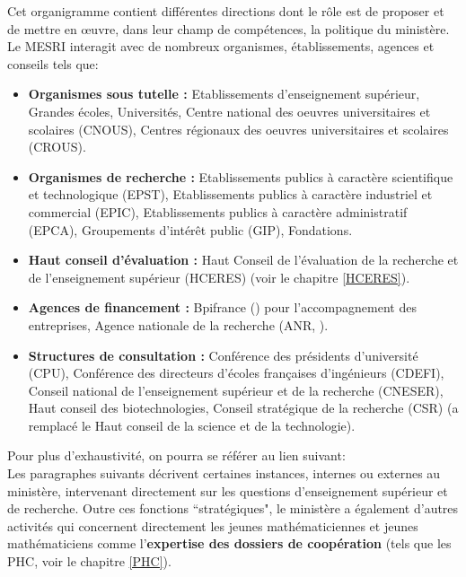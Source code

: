 Cet organigramme contient diff{\'e}rentes directions dont le r\^ole est de proposer et de mettre en \oe{}uvre, dans leur champ de comp\'etences, la politique du minist\`ere.
\newline
\newline
Le MESRI interagit avec de nombreux organismes, \'etablisse\-ments, agences et conseils tels que:
\begin{itemize}
 \item \textbf{Organismes sous tutelle :} Etablissements d'enseignement sup{\'e}rieur, Grandes {\'e}coles, Universit{\'e}s,
 Centre national des oeuvres universitaires et scolaires (CNOUS), Centres r{\'e}gionaux des oeuvres universitaires et scolaires (CROUS).
 
 \item \textbf{Organismes de recherche :} Etablissements publics {\`a} caract{\`e}re scientifique et technologique (EPST),
 Etablissements publics {\`a} caract{\`e}re industriel et commercial (EPIC), Etablissements publics {\`a} caract{\`e}re administratif (EPCA),  Groupements d'int{\'e}r{\^e}t public (GIP), Fondations.
 
 \item \textbf{Haut conseil d'{\'e}valuation :} Haut Conseil de l'{\'e}valuation de la recherche et de l'enseignement sup{\'e}rieur (HCERES) (voir le chapitre \ref{HCERES}).
 
 \item \textbf{Agences de financement :} Bpifrance ({\small{}}) pour l'accompagnement des entreprises, Agence nationale de la recherche (ANR,
 {\small{}}).

 \item \textbf{Structures de consultation :} Conf{\'e}rence des pr{\'e}sidents d'universit{\'e} (CPU), 
 Conf{\'e}rence des directeurs d'{\'e}coles fran\c caises d'ing{\'e}nieurs (CDEFI),
 Conseil national de l'enseignement sup{\'e}rieur et de la recherche (CNESER), Haut conseil des biotechnologies, 
 Conseil strat{\'e}gique de la recherche (CSR) (a remplac{\'e} le Haut conseil de la science et de la technologie).
\end{itemize}
Pour plus d'exhaustivit\'e, on pourra se r\'ef\'erer au lien suivant: \\
{\small {}}
\newline
\newline
Les paragraphes suivants d\'ecrivent certaines instances, internes ou externes au minist\`ere, 
intervenant directement sur les questions d'enseignement sup\'erieur et de recherche.
\newline
\newline
Outre ces fonctions ``strat\'egiques", le minist\`ere a \'egalement d'autres activit\'es qui concernent directement les
jeunes math\'ematiciennes et jeunes math\'ematiciens comme l'{\bf expertise des dossiers de coop\'eration} (tels que les PHC, voir le chapitre \ref{PHC}).

